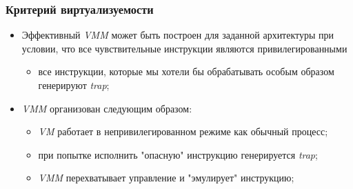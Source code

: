 \begin{frame}
\frametitle{Критерий виртуализуемости}
\begin{itemize}
  \item<1-> Эффективный \emph{VMM} может быть построен для заданной архитектуры
        при условии, что все чувствительные инструкции являются
        привилегированными
    \begin{itemize}
      \item все инструкции, которые мы хотели бы обрабатывать особым образом
            генерируют \emph{trap};
    \end{itemize}
  \item<2-> \emph{VMM} организован следующим образом:
    \begin{itemize}
      \item \emph{VM} работает в непривилегированном режиме как обычный процесс;
      \item при попытке исполнить "опасную" инструкцию генерируется \emph{trap};
      \item \emph{VMM} перехватывает управление и "эмулирует" инструкцию;
    \end{itemize}
\end{itemize}
\end{frame}
